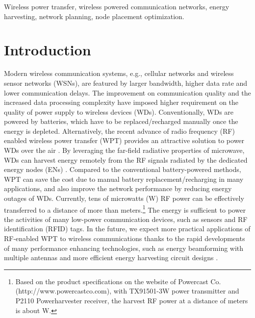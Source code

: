 \documentclass[journal, draftcls, one column, 12pt]{IEEEtran}
\begin{document}
\begin{IEEEkeywords}
Wireless power transfer, wireless powered communication networks, energy harvesting, network planning, node placement optimization.
\end{IEEEkeywords}

\section{Introduction}
Modern wireless communication systems, e.g., cellular networks and wireless sensor networks (WSNs), are featured by larger bandwidth, higher data rate and lower communication delays. The improvement on communication quality and the increased data processing complexity have imposed higher requirement on the quality of power supply to wireless devices (WDs). Conventionally, WDs are powered by batteries, which have to be replaced/recharged manually once the energy is depleted. Alternatively, the recent advance of radio frequency (RF) enabled wireless power transfer (WPT) provides an attractive solution to power WDs over the air \cite{2014:Bi,2015:Lu}. By leveraging the far-field radiative properties of microwave, WDs can harvest energy remotely from the RF signals radiated by the dedicated energy nodes (ENs) \cite{2013:Zhou}. Compared to the conventional battery-powered methods, WPT can save the cost due to manual battery replacement/recharging in many applications, and also improve the network performance by reducing energy outages of WDs. Currently, tens of microwatts (W) RF power can be effectively transferred to a distance of more than  meters.\footnote{Based on the product specifications on the website of Powercast Co. (http://www.powercastco.com), with TX91501-3W power transmitter and P2110 Powerharvester receiver, the harvest RF power at a distance of  meters is about W.} The energy is sufficient to power the activities of many low-power communication devices, such as sensors and RF identification (RFID) tags. In the future, we expect more practical applications of RF-enabled WPT to wireless communications thanks to the rapid developments of many performance enhancing technologies, such as energy beamforming with multiple antennas \cite{2013:Zhang} and more efficient energy harvesting circuit designs \cite{2010:Georgiadis}.
\end{document}
